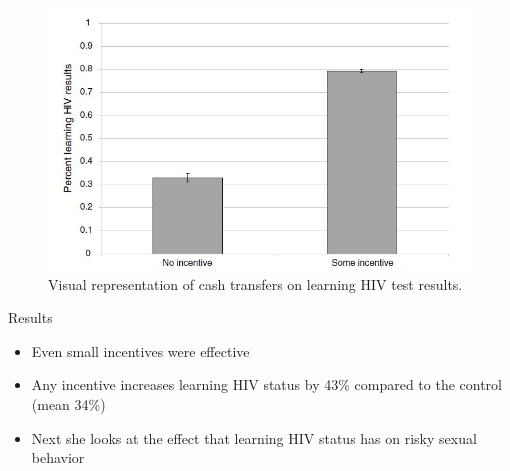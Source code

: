 \documentclass{beamer}
\begin{document}
\begin{frame}[plain]

  \begin{figure}[htb]\centering
    \includegraphics[scale=0.5]{./lecture_includes/FigA.jpg}
    \caption{Visual representation of cash transfers on learning HIV test results.}
    \label{fig:thorntonfig}
  \end{figure}

\end{frame}


\begin{frame}{Results}

  \begin{itemize}
    \item Even small incentives were effective
    \item Any incentive increases learning HIV status by 43\% compared to the control (mean 34\%)
    \item Next she looks at the effect that learning HIV status has on risky sexual behavior
  \end{itemize}

\end{frame}
\end{document}
